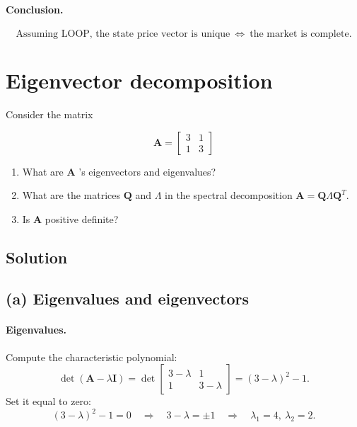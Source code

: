 \documentclass{article}
\begin{document}
\paragraph{Conclusion.}
\[
\boxed{\text{Assuming LOOP, the state price vector is unique}\ \iff\ \text{the market is complete}.}
\]


\newpage
\section{Eigenvector decomposition}
Consider the matrix

\[
\mathbf{A}=\left[\begin{array}{ll}
3 & 1 \\
1 & 3
\end{array}\right]
\]

\begin{enumerate}
\item[(a)] What are $\mathbf{A}$ 's eigenvectors and eigenvalues?
\item[(b)] What are the matrices $\mathbf{Q}$ and $\Lambda$ in the spectral decomposition $\mathbf{A}=\mathbf{Q} \Lambda \mathbf{Q}^{T}$.
\item[(c)] Is $\mathbf{A}$ positive definite?
\end{enumerate}


\bigskip

\subsection*{Solution}

\subsection*{(a) Eigenvalues and eigenvectors}

\paragraph{Eigenvalues.}
Compute the characteristic polynomial:
\[
\det(\mathbf{A}-\lambda \mathbf{I})
=
\det\begin{bmatrix}
3-\lambda & 1\\
1 & 3-\lambda
\end{bmatrix}
=
(3-\lambda)^2-1.
\]
Set it equal to zero:
\[
(3-\lambda)^2-1=0
\quad\Longrightarrow\quad
3-\lambda=\pm 1
\quad\Longrightarrow\quad
\boxed{\lambda_1=4,\ \lambda_2=2.}
\]
\end{document}
